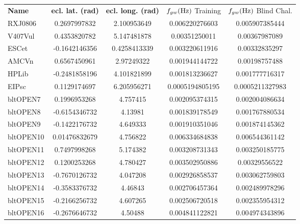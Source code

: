 \documentclass[11pt]{report}
\begin{document}
\begin{description}
\begin{center}
\begin{table}
\begin{tabular}{|l|c|c|c|c|}
\hline \textbf{Name} & {\bf ecl. lat. (rad)} & {\bf ecl.
long. (rad)} & $f_{gw} ({\rm Hz})$  Training  & $f_{gw} ({\rm Hz})$ Blind Chal.  \\
RXJ0806         & 0.2697997832          & 2.100953649   & 0.006220276603        &       0.005907385444\\
V407Vul         & 0.4353820782          & 5.147481878   & 0.00351250011         &       0.00367987089\\
ESCet           & -0.1642146356         & 0.4258413339  & 0.003220611916        &       0.00332835297\\
AMCVn           & 0.6567450961          & 2.97249322    & 0.001944144722        &       0.00198757488\\
HPLib           & -0.2481858196         & 4.101821899   & 0.001813236627        &       0.001777716317\\
EIPsc           & 0.1129174697          & 6.205956271   & 0.0005194805195       &       0.0005211327983\\
\hline
bltOPEN7        & 0.1996953268          & 4.757415      & 0.002095374315        &       0.002004086634\\
bltOPEN8        & -0.6154346732         & 4.13981       & 0.001839178549        &       0.001767880534\\
bltOPEN9        & -0.1422176732         & 4.649333      & 0.001910351046        &       0.001874145362\\
bltOPEN10       & 0.01476832679         & 4.756822      & 0.006334684838        &       0.006544361142\\
bltOPEN11       & 0.7497998268          & 5.174382      & 0.003208731343        &       0.003250185775\\
bltOPEN12       & 0.1200253268          & 4.780427      & 0.003502950886        &       0.00329556522\\
bltOPEN13       & -0.7670126732         & 4.047208      & 0.002926858537        &       0.003062759803\\
bltOPEN14       & -0.3583376732         & 4.46843       & 0.002706457364        &       0.002489978296\\
bltOPEN15       & -0.2166256732         & 4.607265      & 0.002506720518        &       0.002355954312\\
bltOPEN16       & -0.2676646732         & 4.50488       & 0.004841122821        &       0.004974343896\\

\end{tabular}
\end{table}
\end{center}
\end{description}
\end{document}
